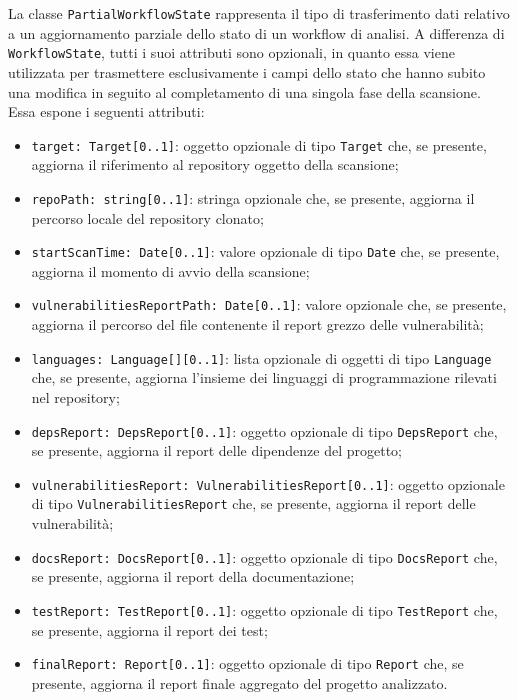 \documentclass[a4paper, 11pt]{article}
\newcounter{subsubsubsection}[subsubsection]
\begin{document}
\label{sec:PartialWorkflowState}

La classe \texttt{PartialWorkflowState} rappresenta il tipo di trasferimento dati relativo a un
aggiornamento parziale dello stato di un workflow di analisi. A differenza di \texttt{WorkflowState},
tutti i suoi attributi sono opzionali, in quanto essa viene utilizzata per trasmettere esclusivamente
i campi dello stato che hanno subito una modifica in seguito al completamento di una singola fase
della scansione. Essa espone i seguenti attributi:

\begin{itemize}
  \item \texttt{target: Target[0..1]}: oggetto opzionale di tipo \texttt{Target} che, se presente,
    aggiorna il riferimento al repository oggetto della scansione;

  \item \texttt{repoPath: string[0..1]}: stringa opzionale che, se presente, aggiorna il percorso
    locale del repository clonato;

  \item \texttt{startScanTime: Date[0..1]}: valore opzionale di tipo \texttt{Date} che, se
    presente, aggiorna il momento di avvio della scansione;

  \item \texttt{vulnerabilitiesReportPath: Date[0..1]}: valore opzionale che, se presente,
    aggiorna il percorso del file contenente il report grezzo delle vulnerabilità;

  \item \texttt{languages: Language[][0..1]}: lista opzionale di oggetti di tipo
    \texttt{Language} che, se presente, aggiorna l'insieme dei linguaggi di programmazione
    rilevati nel repository;

  \item \texttt{depsReport: DepsReport[0..1]}: oggetto opzionale di tipo \texttt{DepsReport}
    che, se presente, aggiorna il report delle dipendenze del progetto;

  \item \texttt{vulnerabilitiesReport: VulnerabilitiesReport[0..1]}: oggetto opzionale di tipo \newline
    \texttt{VulnerabilitiesReport} che, se presente, aggiorna il report delle vulnerabilità;

  \item \texttt{docsReport: DocsReport[0..1]}: oggetto opzionale di tipo \texttt{DocsReport}
    che, se presente, aggiorna il report della documentazione;

  \item \texttt{testReport: TestReport[0..1]}: oggetto opzionale di tipo \texttt{TestReport}
    che, se presente, aggiorna il report dei test;

  \item \texttt{finalReport: Report[0..1]}: oggetto opzionale di tipo \texttt{Report} che, se
    presente, aggiorna il report finale aggregato del progetto analizzato.
\end{itemize}
\end{document}
